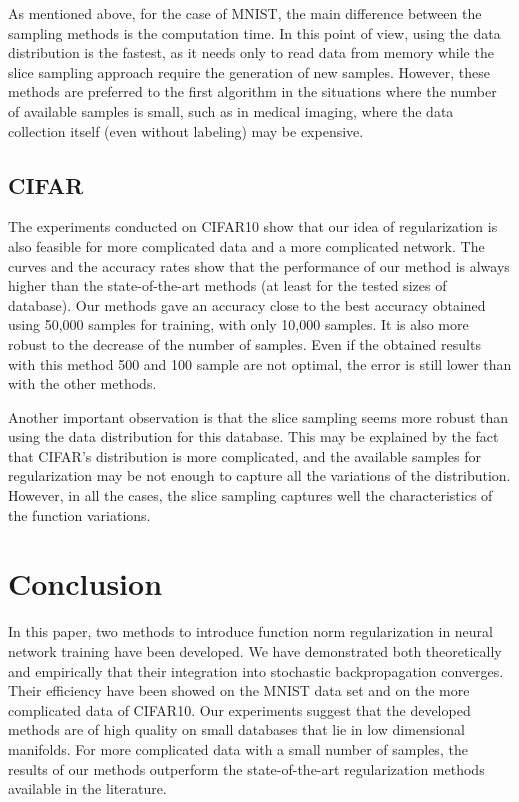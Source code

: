 \documentclass{article}
\begin{document}
As mentioned above, for the case of MNIST, the main difference between the sampling methods is the computation time. In this point of view, using the data distribution is the fastest, as it needs only to read data from memory while the slice sampling approach require the generation of new samples. However, these methods are preferred to the first algorithm in the situations where the number of available samples is small, such as in medical imaging, where the data collection itself (even without labeling) may be expensive. 

\subsection{CIFAR}
The experiments conducted on CIFAR10 show that our idea of regularization is also feasible for more complicated data and a more complicated network. The curves and the accuracy rates show that the performance of our method is always higher than the state-of-the-art methods (at least for the tested sizes of database). Our methods gave an accuracy close to the best accuracy obtained using 50,000 samples for training, with only 10,000 samples. It is also more robust to the decrease of the number of samples. Even if the obtained results with this method 500 and 100 sample are not optimal, the error is still lower than with the other methods. 


Another important observation is that the slice sampling seems more robust than using the data distribution for this database. This may be explained by the fact that CIFAR's distribution is more complicated, and the available samples for regularization may be not enough to capture all the variations of the distribution. However, in all the cases, the slice sampling captures well the characteristics of the function variations. 

\section{Conclusion}
In this paper, two methods to introduce function norm regularization in neural network training have been developed. We have demonstrated both theoretically and empirically that their integration into stochastic backpropagation converges. Their efficiency have been showed on the  MNIST data set and on the more complicated data of CIFAR10. Our experiments suggest that the developed methods are of high quality on small databases that lie in low dimensional manifolds. For more complicated data with a small number of samples, the results of our methods outperform the state-of-the-art regularization methods available in the literature. 
\end{document}
